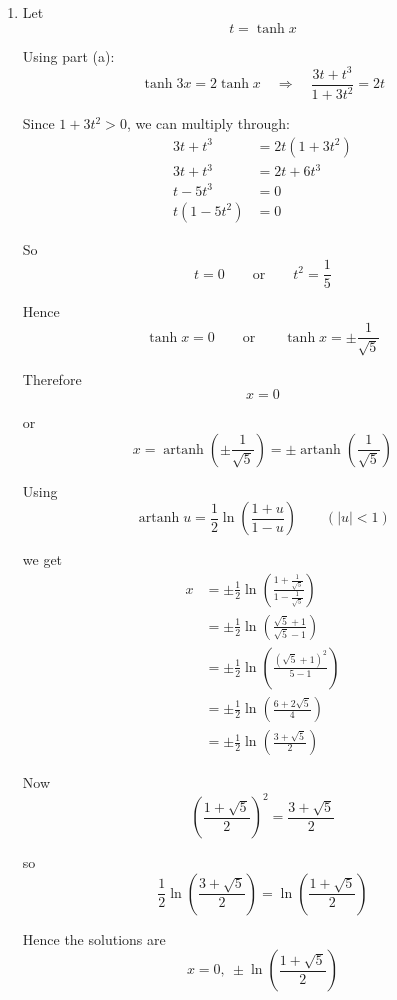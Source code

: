 \documentclass[leqno]{article}
\begin{document}
\begin{enumerate}[
  label=\textbf{\arabic*.},
  leftmargin=*,
  topsep=0pt,
  partopsep=0pt,
  parsep=0pt
]
\begin{djsSolution}
\begin{enumerate}[label=\textbf{(\alph*)}]
So
\begin{align*}
\frac{3\tanh x+\tanh^3x}{1+3\tanh^2x}
&=\frac{(y-1)4(y^2+y+1)}{(y+1)4(y^2-y+1)} \\
&=\frac{(y-1)(y^2+y+1)}{(y+1)(y^2-y+1)} \\
&=\frac{y^3-1}{y^3+1} \\
&=\tanh 3x
\end{align*}

Hence
\[
\tanh 3x \equiv \frac{3\tanh x+\tanh^3x}{1+3\tanh^2x}
\]

\item Let
\[
t=\tanh x
\]

Using part (a):
\[
\tanh 3x=2\tanh x
\quad\Longrightarrow\quad
\frac{3t+t^3}{1+3t^2}=2t
\]

Since \(1+3t^2>0\), we can multiply through:
\begin{align*}
3t+t^3&=2t(1+3t^2) \\
3t+t^3&=2t+6t^3 \\
t-5t^3&=0 \\
t(1-5t^2)&=0
\end{align*}

So
\[
t=0
\qquad\text{or}\qquad
t^2=\frac15
\]

Hence
\[
\tanh x=0
\qquad\text{or}\qquad
\tanh x=\pm\frac{1}{\sqrt5}
\]

Therefore
\[
x=0
\]

or
\[
x=\operatorname{artanh}\left(\pm\frac1{\sqrt5}\right)
=\pm\operatorname{artanh}\left(\frac1{\sqrt5}\right)
\]

Using
\[
\operatorname{artanh}u=\frac12\ln\left(\frac{1+u}{1-u}\right)\qquad (|u|<1)
\]

we get
\begin{align*}
x
&=\pm \frac12\ln\left(\frac{1+\frac1{\sqrt5}}{1-\frac1{\sqrt5}}\right) \\
&=\pm \frac12\ln\left(\frac{\sqrt5+1}{\sqrt5-1}\right) \\
&=\pm \frac12\ln\left(\frac{(\sqrt5+1)^2}{5-1}\right) \\
&=\pm \frac12\ln\left(\frac{6+2\sqrt5}{4}\right) \\
&=\pm \frac12\ln\left(\frac{3+\sqrt5}{2}\right)
\end{align*}

Now
\[
\left(\frac{1+\sqrt5}{2}\right)^2=\frac{3+\sqrt5}{2}
\]

so
\[
\frac12\ln\left(\frac{3+\sqrt5}{2}\right)=\ln\left(\frac{1+\sqrt5}{2}\right)
\]

Hence the solutions are
\[
x=0,\ \pm \ln\left(\frac{1+\sqrt5}{2}\right)
\]
\end{enumerate}
\end{djsSolution}



\end{enumerate}
\end{document}
